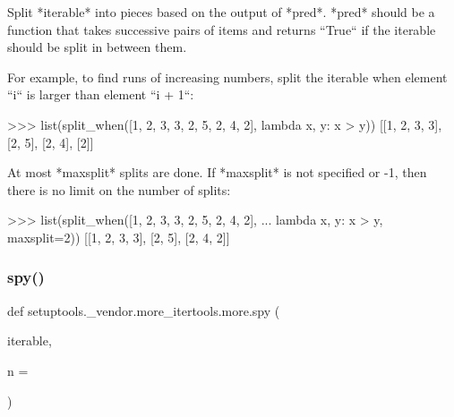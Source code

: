 \begin{DoxyVerb}Split *iterable* into pieces based on the output of *pred*.
*pred* should be a function that takes successive pairs of items and
returns ``True`` if the iterable should be split in between them.

For example, to find runs of increasing numbers, split the iterable when
element ``i`` is larger than element ``i + 1``:

    >>> list(split_when([1, 2, 3, 3, 2, 5, 2, 4, 2], lambda x, y: x > y))
    [[1, 2, 3, 3], [2, 5], [2, 4], [2]]

At most *maxsplit* splits are done. If *maxsplit* is not specified or -1,
then there is no limit on the number of splits:

    >>> list(split_when([1, 2, 3, 3, 2, 5, 2, 4, 2],
    ...                 lambda x, y: x > y, maxsplit=2))
    [[1, 2, 3, 3], [2, 5], [2, 4, 2]]\end{DoxyVerb}
 \mbox{\label{namespacesetuptools_1_1__vendor_1_1more__itertools_1_1more_aeb5af9ad47daaf34183f6d97f357854e}} 
\subsubsection{\texorpdfstring{spy()}{spy()}}
{\footnotesize\ttfamily def setuptools.\+\_\+vendor.\+more\+\_\+itertools.\+more.\+spy (\begin{DoxyParamCaption}\item[{}]{iterable,  }\item[{}]{n = {} }\end{DoxyParamCaption})}

